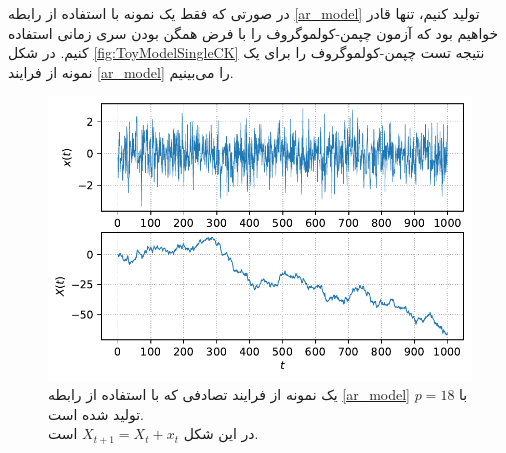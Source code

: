  در صورتی که فقط یک نمونه با استفاده از رابطه \ref{ar_model} تولید کنیم، تنها قادر خواهیم بود که آزمون چپمن-کولموگروف 
را با فرض همگن بودن سری زمانی استفاده کنیم. در شکل \ref{fig:ToyModelSingleCK} نتیجه تست چپمن-کولموگروف را برای 
یک نمونه از فرایند \ref{ar_model} را می‌بینیم.
 \begin{figure}[H]
  \centering
  \includegraphics[width=\textwidth]{images/singleSample.pdf}
  \caption{یک نمونه از فرایند تصادفی که با استفاده از رابطه \ref{ar_model} با $p=18$ تولید شده است.\\ در این شکل $X_{t+1}=X_{t}+x_{t}$ است.}
  \label{fig:singleSample}
\end{figure}

